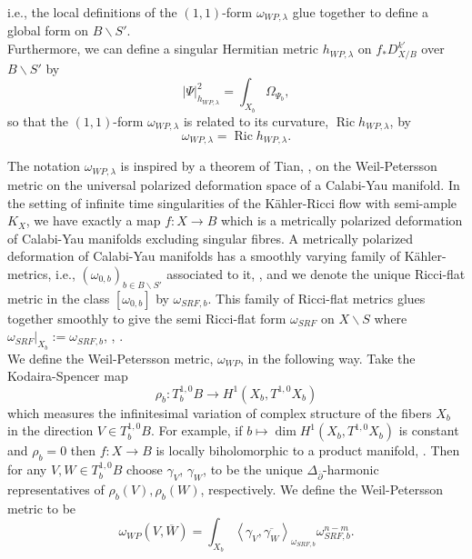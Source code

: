 \documentclass[12pt]{article}
\numberwithin{equation}{section}
\newcommand{\dbar}{\overline{\partial}}
\DeclareMathOperator{\Ric}{Ric}
\newcommand{\oo}[1]{\overline{#1}}
\newcommand{\ip}[1]{\left\langle#1\right\rangle}
\newcommand{\abs}[1]{\left|#1\right|}
\begin{document}
i.e., the local definitions of the $(1,1)$-form $\omega_{WP,\lambda}$ glue together to define a global form on $B\backslash S'$.\\
Furthermore, we can define a singular Hermitian metric $h_{WP,\lambda}$ on $f_* D_{X/B}^{k'}$ over $B \backslash S'$ by
\begin{equation*}
    \abs{\Psi}^2_{h_{WP,\lambda}} = \int_{X_b} \Omega_{\Psi_b},
\end{equation*}
so that the $(1,1)$-form $\omega_{WP,\lambda}$ is related to its curvature, $\Ric h_{WP,\lambda}$, by
\begin{equation*}
    \omega_{WP,\lambda} = \Ric h_{WP,\lambda}.
\end{equation*}

\noindent The notation $\omega_{WP,\lambda}$ is inspired by a theorem of Tian, \cite[Thm. 2]{T87}, on the Weil-Petersson metric on the universal polarized deformation space of a Calabi-Yau manifold. In the setting of infinite time singularities of the K\"ahler-Ricci flow with semi-ample $K_X$, we have exactly a map $f: X \to B$ which is a metrically polarized deformation of Calabi-Yau manifolds excluding singular fibres. A metrically polarized deformation of Calabi-Yau manifolds has a smoothly varying family of K\"ahler-metrics, i.e., $(\omega_{0,b})_{b \in B \backslash S'}$ associated to it, \cite[Defn. 3.2]{FS90}, and we denote the unique Ricci-flat metric in the class $[\omega_{0,b}]$ by $\omega_{SRF,b}$. This family of Ricci-flat metrics glues together smoothly to give the semi Ricci-flat form $\omega_{SRF}$ on $X \backslash S$ where $\omega_{SRF}|_{X_b} := \omega_{SRF,b}$, \cite{ST07}, \cite[Lem. 3.2]{ST12}.\\
We define the Weil-Petersson metric, $\omega_{WP}$, in the following way. Take the Kodaira-Spencer map
\begin{equation*}
    \rho_b: T^{1,0}_b B \to H^{1}(X_b,T^{1,0}X_b)
\end{equation*}
which measures the infinitesimal variation of complex structure of the fibers $X_b$ in the direction $V \in T^{1,0}_b B$. For example, if $b \mapsto \dim H^{1}(X_b,T^{1,0}X_b)$ is constant and $\rho_b = 0$ then $f:X \to B$ is locally biholomorphic to a product manifold, \cite[Thm. 4.6]{K86}. Then for any $V, W \in T^{1,0}_b B$ choose $\gamma_V$, $\gamma_W$, to be the unique $\Delta_{\dbar}$-harmonic representatives of $\rho_b(V), \rho_b(W)$, respectively. We define the Weil-Petersson metric to be
\begin{equation*}
    \omega_{WP}(V,\oo{W}) = \int_{X_b} \ip{\gamma_V, \oo{\gamma_W}}_{\omega_{SRF,b}} \omega_{SRF,b}^{n-m}. 
\end{equation*}
\end{document}
